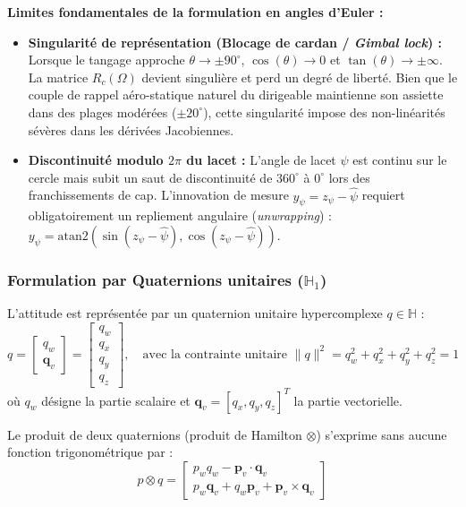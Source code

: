 \documentclass[../Formulations_Kalman.tex]{subfiles}
\begin{document}
\textbf{Limites fondamentales de la formulation en angles d'Euler :}
\begin{itemize}
    \item \textbf{Singularité de représentation (Blocage de cardan / \textit{Gimbal lock}) :} Lorsque le tangage approche $\theta \to \pm 90^\circ$, $\cos(\theta) \to 0$ et $\tan(\theta) \to \pm \infty$. La matrice $R_c(\Omega)$ devient singulière et perd un degré de liberté. Bien que le couple de rappel aéro-statique naturel du dirigeable maintienne son assiette dans des plages modérées ($\pm 20^\circ$), cette singularité impose des non-linéarités sévères dans les dérivées Jacobiennes.
    \item \textbf{Discontinuité modulo $2\pi$ du lacet :} L'angle de lacet $\psi$ est continu sur le cercle mais subit un saut de discontinuité de $360^\circ$ à $0^\circ$ lors des franchissements de cap. L'innovation de mesure $y_\psi = z_\psi - \hat{\psi}$ requiert obligatoirement un repliement angulaire (\textit{unwrapping}) : $y_\psi = \text{atan2}(\sin(z_\psi - \hat{\psi}), \cos(z_\psi - \hat{\psi}))$.
\end{itemize}

\subsubsection{Formulation par Quaternions unitaires ($\mathbb{H}_1$)}
L'attitude est représentée par un quaternion unitaire hypercomplexe $q \in \mathbb{H}$ :
\begin{equation}
q = \begin{bmatrix} q_w \\ \mathbf{q}_v \end{bmatrix} = \begin{bmatrix} q_w \\ q_x \\ q_y \\ q_z \end{bmatrix}, \quad \text{avec la contrainte unitaire } \|q\|^2 = q_w^2 + q_x^2 + q_y^2 + q_z^2 = 1
\end{equation}
où $q_w$ désigne la partie scalaire et $\mathbf{q}_v = [q_x, q_y, q_z]^T$ la partie vectorielle.

Le produit de deux quaternions (produit de Hamilton $\otimes$) s'exprime sans aucune fonction trigonométrique par :
\begin{equation}
p \otimes q = \begin{bmatrix} p_w q_w - \mathbf{p}_v \cdot \mathbf{q}_v \\ p_w \mathbf{q}_v + q_w \mathbf{p}_v + \mathbf{p}_v \times \mathbf{q}_v \end{bmatrix}
\end{equation}
\end{document}
